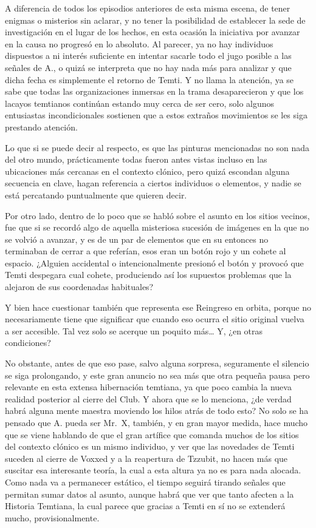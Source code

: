 \documentclass[
]{book}
\begin{document}
A diferencia de todos los episodios anteriores de esta misma escena, de tener enigmas o misterios sin aclarar, y no tener la posibilidad de establecer la sede de investigación en el lugar de los hechos, en esta ocasión la iniciativa por avanzar en la causa no progresó en lo absoluto. Al parecer, ya no hay individuos dispuestos a ni interés suficiente en intentar sacarle todo el jugo posible a las señales de A., o quizá se interpreta que no hay nada más para analizar y que dicha fecha es simplemente el retorno de Temti. Y no llama la atención, ya se sabe que todas las organizaciones inmersas en la trama desaparecieron y que los lacayos temtianos continúan estando muy cerca de ser cero, solo algunos entusiastas incondicionales sostienen que a estos extraños movimientos se les siga prestando atención.

Lo que si se puede decir al respecto, es que las pinturas mencionadas no son nada del otro mundo, prácticamente todas fueron antes vistas incluso en las ubicaciones más cercanas en el contexto clónico, pero quizá escondan alguna secuencia en clave, hagan referencia a ciertos individuos o elementos, y nadie se está percatando puntualmente que quieren decir.

Por otro lado, dentro de lo poco que se habló sobre el asunto en los sitios vecinos, fue que si se recordó algo de aquella misteriosa sucesión de imágenes en la que no se volvió a avanzar, y es de un par de elementos que en su entonces no terminaban de cerrar a que referían, esos eran un botón rojo y un cohete al espacio. ¿Alguien accidental o intencionalmente presionó el botón y provocó que Temti despegara cual cohete, produciendo así los supuestos problemas que la alejaron de sus coordenadas habituales?

Y bien hace cuestionar también que representa ese Reingreso en orbita, porque no necesariamente tiene que significar que cuando eso ocurra el sitio original vuelva a ser accesible. Tal vez solo se acerque un poquito más\ldots{} Y, ¿en otras condiciones?

No obstante, antes de que eso pase, salvo alguna sorpresa, seguramente el silencio se siga prolongando, y este gran anuncio no sea más que otra pequeña pausa pero relevante en esta extensa hibernación temtiana, ya que poco cambia la nueva realidad posterior al cierre del Club. Y ahora que se lo menciona, ¿de verdad habrá alguna mente maestra moviendo los hilos atrás de todo esto? No solo se ha pensado que A. pueda ser Mr.~X, también, y en gran mayor medida, hace mucho que se viene hablando de que el gran artífice que comanda muchos de los sitios del contexto clónico es un mismo individuo, y ver que las novedades de Temti suceden al cierre de Voxxed y a la reapertura de Tzzubit, no hacen más que suscitar esa interesante teoría, la cual a esta altura ya no es para nada alocada. Como nada va a permanecer estático, el tiempo seguirá tirando señales que permitan sumar datos al asunto, aunque habrá que ver que tanto afecten a la Historia Temtiana, la cual parece que gracias a Temti en sí no se extenderá mucho, provisionalmente.
\end{document}
